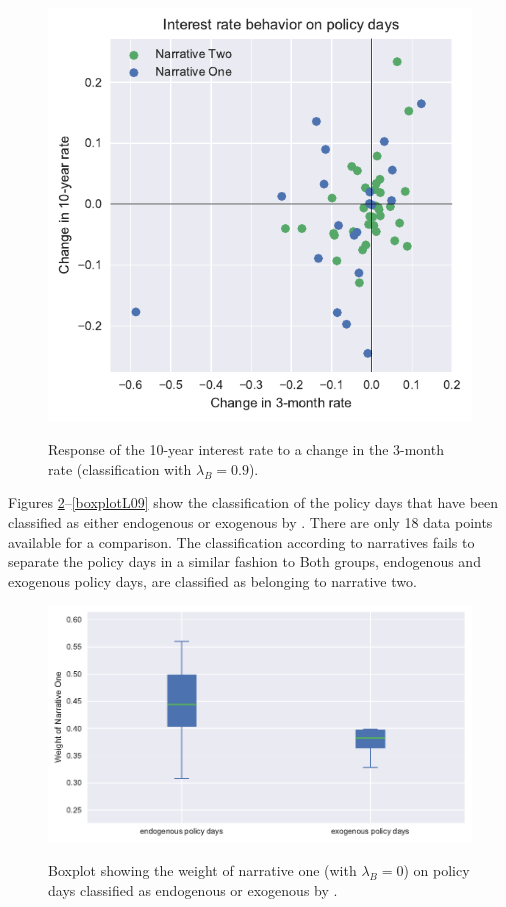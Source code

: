 \documentclass[11pt,a4paper,english,oneside]{book}
\numberwithin{equation}{chapter}
\begin{document}
\begin{figure}
	\caption{Response of the 10-year interest rate to a change in the 3-month rate (classification with $\lambda_B=0.9$).}
	\centering
	\includegraphics[scale=1]{Images/ChangePlot_L0_9.pdf}
	\label{Change02_L09}
\end{figure}


Figures \ref{boxplotL00}--\ref{boxplotL09} show the classification of the policy days that have been classified as either endogenous or exogenous by \citet[p. 11]{Ellingsen.2003}. There are only 18 data points available for a comparison. The classification according to narratives fails to separate the policy days in a similar fashion to \citeauthor{Ellingsen.2003} Both groups, endogenous and exogenous policy days, are classified as belonging to narrative two. 


\begin{figure}
	\caption{Boxplot showing the weight of narrative one (with $\lambda_B=0$) on policy days classified as endogenous or exogenous by \citet[p. 11]{Ellingsen.2003}.}
	\centering
	\includegraphics[scale=1]{Images/boxplot_Lamb_0_0.pdf}
	\label{boxplotL00}
\end{figure}
\end{document}
